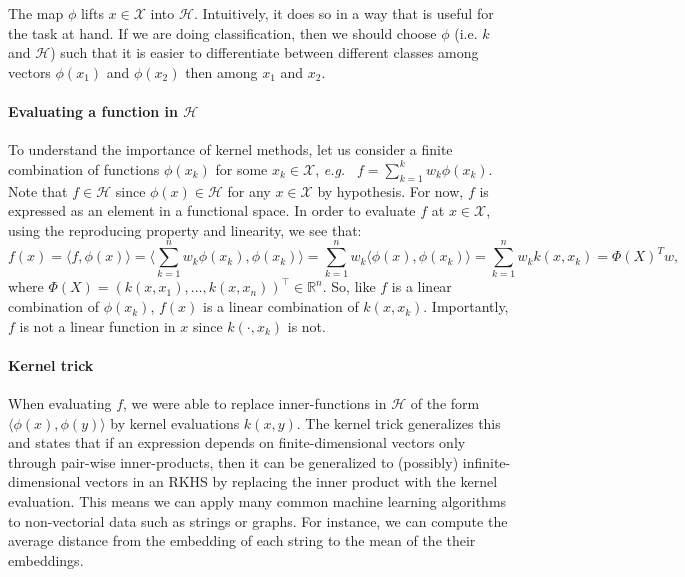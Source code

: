 The map $\phi$ lifts $x\in\mathcal X$ into $\mathcal H$. Intuitively, it does so in a way that is useful for the task at hand. If we are doing classification, then we should choose $\phi$ (i.e. $k$ and $\mathcal H$) such that it is easier to differentiate between different classes among vectors $\phi(x_1)$ and $\phi(x_2)$ then among $x_1$ and $x_2$. %

\paragraph{Evaluating a function in $\mathcal H$}
To understand the importance of kernel methods, let us consider a finite combination of functions $\phi(x_k)$ for some $x_k\in\mathcal X$, \emph{e.g.\ } $f= \sum_{k=1}^k w_k \phi(x_k)$. Note that $f\in\mathcal H$ since $\phi(x)\in\mathcal H$ for any $x\in\mathcal X$ by hypothesis. For now, $f$ is expressed as an element in a functional space. In order to evaluate $f$ at $x\in\mathcal X$, using the reproducing property and linearity, we see that:
\begin{equation*}
f(x) = \langle f, \phi(x)\rangle = \langle \sum_{k=1}^n w_k\phi(x_k), \phi(x_k)\rangle= \sum_{k=1}^nw_k \langle \phi(x), \phi(x_k)\rangle = \sum_{k=1}^nw_k k(x, x_k)= \Phi(X)^Tw,
\end{equation*}
where $\Phi(X) = (k(x, x_1), \ldots, k(x, x_n))^\top\in\mathbb R^n$. So, like $f$ is a linear combination of $\phi(x_k)$, $f(x)$ is a linear combination of $k(x, x_k)$. Importantly, $f$ is not a linear function in $x$ since $k(\cdot, x_k)$ is not.

\paragraph{Kernel trick}
When evaluating $f$, we were able to replace inner-functions in $\mathcal H$ of the form $\langle \phi(x), \phi(y)\rangle$ by kernel evaluations $k(x, y)$. The kernel trick generalizes this and states that if an expression depends on finite-dimensional vectors only through pair-wise inner-products, then it can be generalized to (possibly) infinite-dimensional vectors in an RKHS by replacing the inner product with the kernel evaluation. This means we can apply many common machine learning algorithms to non-vectorial data such as strings or graphs. For instance, we can compute the average distance from the embedding of each string to the mean of the their embeddings.

